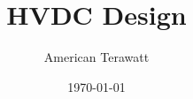 \documentclass[aspectratio=169,11pt]{beamer}
\title{HVDC Design}
\author{American Terawatt}
\date{\today}
\begin{document}
\titleslide


%
%
%
%
%

% 

% 
% 

% 


% 
% 
% 
% 
% 


% 

% 


%

\end{document}
